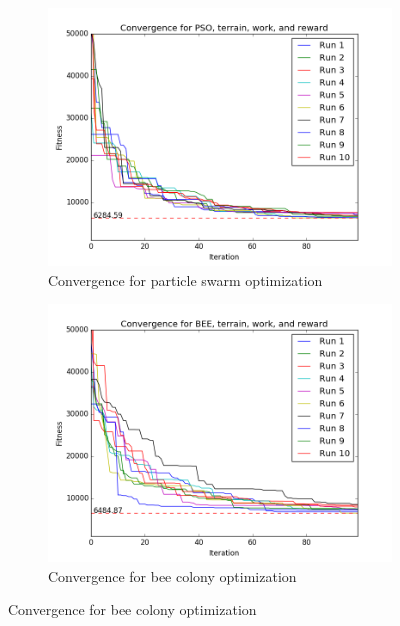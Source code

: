 \documentclass{tamuccthesis}
\begin{document}
\begin{figure}
    \captionsetup{justification=centering}
    \centering
    \begin{subfigure}[b]{0.475\textwidth}
        \centering
        \includegraphics[width=\textwidth]{conv_PSO_b.png}
        \caption[]{{\small Convergence for particle swarm optimization}}
        \label{fig:convergence_b_PSO}
    \end{subfigure}
    \hfill
    \begin{subfigure}[b]{0.475\textwidth}  
        \centering 
        \includegraphics[width=\textwidth]{conv_BEE_b.png}
        \caption[]{{\small Convergence for bee colony optimization }}
        \label{fig:convergence_b_BEE}
    \end{subfigure}

\end{figure}
\end{document}
